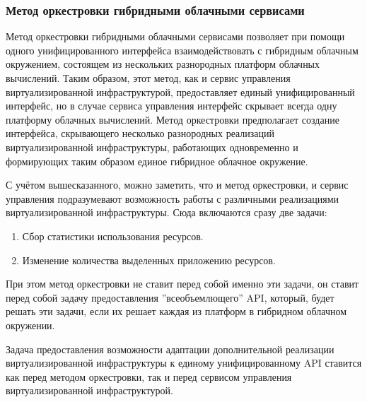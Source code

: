\subsubsection{Метод оркестровки гибридными облачными сервисами}
Метод оркестровки гибридными облачными сервисами\cite{orchestrating-hybrid-cloud-services} позволяет при помощи одного унифицированного интерфейса взаимодействовать с гибридным облачным окружением, состоящем из нескольких разнородных платформ облачных вычислений.
Таким образом, этот метод, как и сервис управления виртуализированной инфраструктурой, предоставляет единый унифицированный интерфейс, но в случае сервиса управления интерфейс скрывает всегда одну платформу облачных вычислений.
Метод оркестровки предполагает создание интерфейса, скрывающего несколько разнородных реализаций виртуализированной инфраструктуры, работающих одновременно и формирующих таким образом единое гибридное облачное окружение.

С учётом вышесказанного, можно заметить, что и метод оркестровки, и сервис управления подразумевают возможность работы с различными реализациями виртуализированной инфраструктуры.
Сюда включаются сразу две задачи:
\begin{enumerate}
    \item Сбор статистики использования ресурсов.
    \item Изменение количества выделенных приложению ресурсов.
\end{enumerate}
При этом метод оркестровки не ставит перед собой именно эти задачи, он ставит перед собой задачу предоставления ''всеобъемлющего'' API, который, будет решать эти задачи, если их решает каждая из платформ в гибридном облачном окружении.

Задача предоставления возможности адаптации дополнительной реализации виртуализированной инфраструктуры к единому унифицированному API ставится как перед методом оркестровки, так и перед сервисом управления виртуализированной инфраструктурой.
